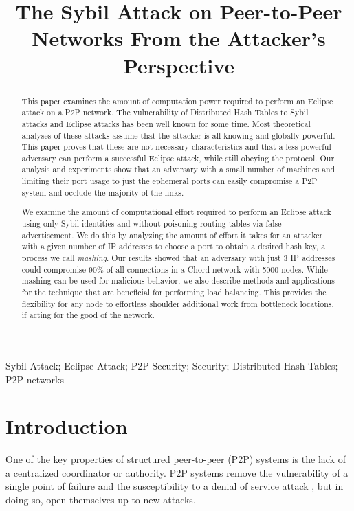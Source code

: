 \documentclass[11pt,conference]{IEEEtran}
\author{\IEEEauthorblockN{Andrew Rosen \qquad Brendan Benshoof \qquad Robert W. Harrison \qquad Anu G. Bourgeois}
    \IEEEauthorblockA{Department of Computer Science\\
        Georgia State University\\
        Atlanta, Georgia\\
        rosen@cs.gsu.edu \qquad  bbenshoof@cs.gsu.edu  \qquad rwh@cs.gsu.edu \qquad anu@cs.gsu.edu }
}
\title{The Sybil Attack on Peer-to-Peer Networks From the Attacker's Perspective}   %
\begin{document}
\maketitle



\begin{abstract}
This paper examines the amount of computation power required to perform an Eclipse attack on a P2P network.
The vulnerability of Distributed Hash Tables to Sybil attacks and Eclipse attacks has been well known for some time.
Most theoretical analyses of these attacks assume that the attacker is all-knowing and globally powerful.
This paper proves that these are not necessary characteristics and that a less powerful adversary can perform a successful Eclipse attack, while still obeying the protocol.
Our analysis and experiments show that an adversary with a small number of machines and limiting their port usage to just the ephemeral ports can easily compromise a P2P system and occlude the majority of the links.

We examine the amount of computational effort required to perform an Eclipse attack using only Sybil identities and without poisoning routing tables via false advertisement.
We do this by analyzing the amount of effort it takes for an attacker with a given number of IP addresses to choose a port to obtain a desired hash key, a process we call \emph{mashing}.
Our results showed that an adversary with just 3 IP addresses could compromise 90\% of all connections in a Chord network with 5000 nodes.
While mashing can be used for malicious behavior, we also describe methods and applications for the technique that are beneficial for performing load balancing.
This provides the flexibility for any node to effortless shoulder additional work from bottleneck locations, if acting for the good of the network.
\end{abstract}

\begin{IEEEkeywords}
    Sybil Attack; Eclipse Attack; P2P Security; Security; Distributed Hash Tables; P2P networks
    
\end{IEEEkeywords}

\section{Introduction}
One of the key properties of structured peer-to-peer (P2P) systems is the lack of a centralized coordinator or authority.
P2P systems remove the vulnerability of a single point of failure and the susceptibility to a denial of service attack \cite{sybil}, but in doing so, open themselves up to new attacks.
\end{document}

